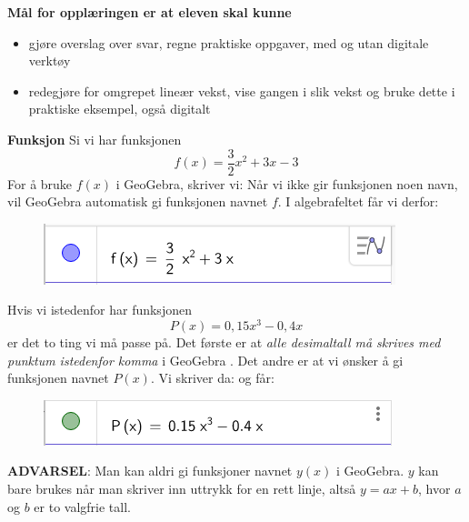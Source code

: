 




\textbf{Mål for opplæringen er at eleven skal kunne}
\begin{itemize}
	\item gjøre overslag over svar, regne praktiske oppgaver, med og utan digitale verktøy
	\item redegjøre for omgrepet lineær vekst, vise gangen i slik vekst og bruke dette i praktiske eksempel, også digitalt
\end{itemize}
\newpage
{}
\textbf{Funksjon}\bs
Si vi har funksjonen 
\[f(x)= \frac{3}{2} x^2 + 3x -3 \]
For å bruke $ f(x) $ i GeoGebra, skriver vi:
Når vi ikke gir funksjonen noen navn, vil GeoGebra automatisk gi funksjonen navnet $ f $. I algebrafeltet får vi derfor:
\begin{figure}[H]
	\centering
	\includegraphics[scale=0.6]{skrivf}
\end{figure}

Hvis vi istedenfor har funksjonen
\[ P(x)= 0,15x^3 - 0,4 x\]
er det to ting vi må passe på. Det første er at \textsl{alle desimaltall må skrives med punktum istedenfor komma} i GeoGebra
. Det andre er at vi ønsker å gi funksjonen navnet $ P(x) $. Vi skriver da:
og får:
\begin{figure}[H]
	\centering
	\includegraphics[scale=0.6]{pfig}
\end{figure}
{\color{red} \textbf{ADVARSEL}:} Man kan aldri gi funksjoner navnet $ {y(x)} $ i GeoGebra. $ y $ kan bare brukes når man skriver inn uttrykk for en rett linje, altså $ {y=ax +b} $, hvor $ a $ og $ b $ er to valgfrie tall.\vsk

